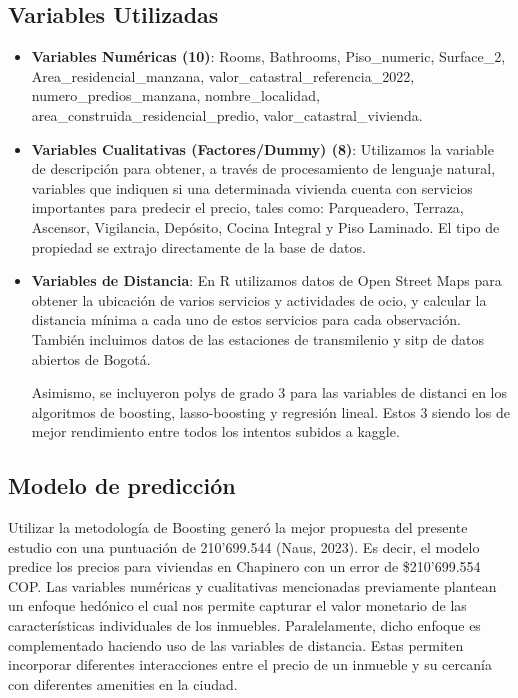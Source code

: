 \documentclass[12pt]{article}
\begin{document}
\subsection{Variables Utilizadas}
\begin{itemize}
    \item \textbf{Variables Numéricas (10)}: Rooms, Bathrooms, Piso\_numeric, Surface\_2, \\
    Area\_residencial\_manzana, valor\_catastral\_referencia\_2022,\\ numero\_predios\_manzana, nombre\_localidad, area\_construida\_residencial\_predio, valor\_catastral\_vivienda.
    \item \textbf{Variables Cualitativas (Factores/Dummy) (8)}: Utilizamos la variable de descripción para obtener, a través de procesamiento de lenguaje natural, variables que indiquen si una determinada vivienda cuenta con servicios importantes para predecir el precio, tales como: Parqueadero, Terraza, Ascensor, Vigilancia, Depósito, Cocina Integral y Piso Laminado. El tipo de propiedad se extrajo directamente de la base de datos.
    \item \textbf{Variables de Distancia}: En R utilizamos datos de Open Street Maps para obtener la ubicación de varios servicios y actividades de ocio, y calcular la distancia mínima a cada uno de estos servicios para cada observación. También incluimos datos de las estaciones de transmilenio y sitp de datos abiertos de Bogotá.

    Asimismo, se incluyeron polys de grado 3 para las variables de distanci en los algoritmos de boosting, lasso-boosting y regresión lineal. Estos 3 siendo los de mejor rendimiento entre todos los intentos subidos a kaggle.
\end{itemize}
    
\subsection{Modelo de predicción}

Utilizar la metodología de Boosting generó la mejor propuesta del presente estudio con una puntuación de 210'699.544 (Naus, 2023). Es decir, el modelo predice los precios para viviendas en Chapinero con un error de \$210’699.554 COP. Las variables numéricas y cualitativas mencionadas previamente plantean un enfoque hedónico el cual nos permite capturar el valor monetario de las características individuales de los inmuebles. Paralelamente, dicho enfoque es complementado haciendo uso de las variables de distancia. Estas permiten incorporar diferentes interacciones entre el precio de un inmueble y su cercanía con diferentes amenities en la ciudad.\\
\end{document}
